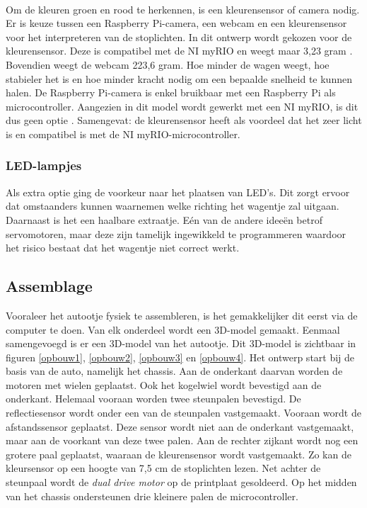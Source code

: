\documentclass[a4paper,twoside,kulak]{kulakreport} %
\begin{document}
~

Om de kleuren groen en rood te herkennen, is een kleurensensor of camera nodig. Er is keuze tussen een Raspberry Pi-camera, een webcam en een kleurensensor voor het interpreteren van de stoplichten. In dit ontwerp wordt gekozen voor de kleurensensor. Deze is compatibel met de NI myRIO en weegt maar 3,23 gram \cite{Webcam,TCS34725KleurSensorBOB}. Bovendien weegt de webcam 223,6 gram. Hoe minder de wagen weegt, hoe stabieler het is en hoe minder kracht nodig om een bepaalde snelheid te kunnen halen. De Raspberry Pi-camera is enkel bruikbaar met een Raspberry Pi als microcontroller. Aangezien in dit model wordt gewerkt met een NI myRIO, is dit dus geen optie \cite{RPi-camera}. Samengevat: de kleurensensor heeft als voordeel dat het zeer licht is en compatibel is met de NI myRIO-microcontroller. %



\subsubsection{LED-lampjes}\label{LED-lampjes}
Als extra optie ging de voorkeur naar het plaatsen van LED's. Dit zorgt ervoor dat omstaanders kunnen waarnemen welke richting het wagentje zal uitgaan. Daarnaast is het een haalbare extraatje. Eén van de andere ideeën betrof servomotoren, maar deze zijn tamelijk ingewikkeld te programmeren waardoor het risico bestaat dat het wagentje niet correct werkt.


\subsection{Assemblage}\label{Assemblage}
Vooraleer het autootje fysiek te assembleren, is het gemakkelijker dit eerst via de computer te doen. Van elk onderdeel wordt een 3D-model gemaakt. Eenmaal samengevoegd is er een 3D-model van het autootje. Dit 3D-model is zichtbaar in figuren \ref{opbouw1}, \ref{opbouw2}, \ref{opbouw3} en \ref{opbouw4}.
Het ontwerp start bij de basis van de auto, namelijk het chassis. Aan de onderkant daarvan worden de motoren met wielen  geplaatst. Ook het kogelwiel wordt bevestigd aan de onderkant. Helemaal vooraan worden twee steunpalen bevestigd. De reflectiesensor wordt onder een van de steunpalen vastgemaakt. Vooraan wordt de afstandssensor geplaatst. Deze sensor wordt niet aan de onderkant vastgemaakt, maar aan de voorkant van deze twee palen. Aan de rechter zijkant wordt nog een grotere paal geplaatst, waaraan de kleurensensor wordt vastgemaakt. Zo kan de kleursensor op een hoogte van 7,5 cm de stoplichten lezen. Net achter de steunpaal wordt de {\it dual drive motor} op de printplaat gesoldeerd. Op het midden van het chassis ondersteunen drie kleinere palen de microcontroller. 
\end{document}
